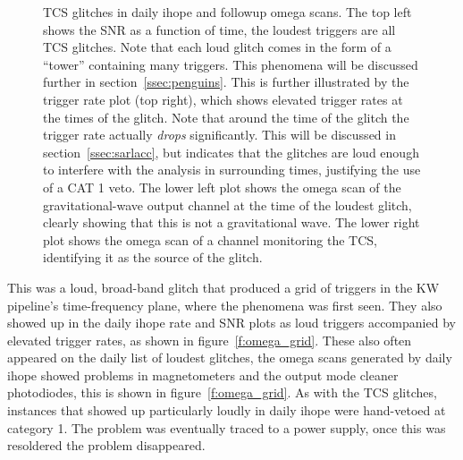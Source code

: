 \begin{figure}
  \caption[TCS glitch in daily ihope and omega]{
  \label{f:daily_ihope_tcs}
TCS glitches in daily ihope and followup omega scans.  The top left
shows the SNR as a function of time, the loudest triggers are all TCS
glitches.  Note that each loud glitch comes in the form of a ``tower''
containing many triggers.  This phenomena will be discussed further in
section~\ref{ssec:penguins}.  This is further illustrated by the trigger
rate plot (top right), which shows elevated trigger rates at the times
of the glitch.  Note that around the time of the glitch the trigger
rate actually {\it drops} significantly.  This will be discussed in
section~\ref{ssec:sarlacc}, but indicates that the glitches are loud
enough to interfere with the analysis in surrounding times, justifying
the use of a CAT 1 veto.  The lower left plot shows the omega scan
of the gravitational-wave output channel at the time of the loudest
glitch, clearly showing that this is not a gravitational wave.  The
lower right plot shows the omega scan of a channel monitoring the TCS,
identifying it as the source of the glitch.}
\end{figure}%



This was a loud, broad-band glitch that produced a grid of triggers in
the KW pipeline's time-frequency plane, where the phenomena was first
seen.  They also showed up in the daily ihope rate and SNR plots as
loud triggers accompanied by elevated trigger rates, as shown in
figure~\ref{f:omega_grid}.  These also often appeared on the
daily list of loudest glitches, the omega scans generated by daily
ihope showed problems in magnetometers and the output mode cleaner
photodiodes, this is shown in figure~\ref{f:omega_grid}.  As with the
TCS glitches, instances that showed up particularly loudly in daily
ihope were hand-vetoed at category 1.  The problem was eventually
traced to a power supply, once this was resoldered the problem
disappeared.



